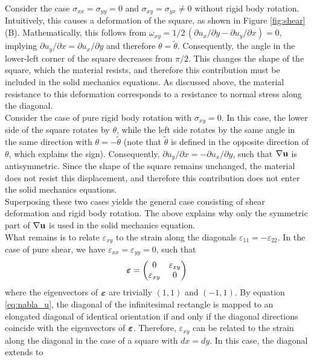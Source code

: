 Consider the case $\sigma_{xx}=\sigma_{yy}= 0$ and $\sigma_{xy}=\sigma_{yx}\neq 0$ without rigid body rotation. Intuitively, this causes a deformation of the square, as shown in Figure \ref{fig:shear} (B). Mathematically, this follows from $\omega_{xy}=1/2\, (\partial u_x/\partial y - \partial u_y / \partial x)=0$, implying $\partial u_y / \partial x=\partial u_x / \partial y$ and therefore $\theta=\tilde\theta$. Consequently, the angle in the lower-left corner of the square decreases from $\pi/2$. This changes the shape of the square, which the material resists, and therefore this contribution must be included in the solid mechanics equations. As discussed above, the material resistance to this deformation corresponds to a resistance to normal stress along the diagonal.\\
Consider the case of pure rigid body rotation with $\sigma_{xy}=0$. In this case, the lower side of the square rotates by $\theta$, while the left side rotates by the same angle in the same direction with $\theta=-\tilde{\theta}$ (note that $\tilde{\theta}$ is defined in the opposite direction of $\theta$, which explains the sign). Consequently, $\partial u_y / \partial x=-\partial u_x / \partial y$, such that $\nabla\mathbf{u}$ is antisymmetric. Since the shape of the square remains unchanged, the material does not resist this displacement, and therefore this contribution does not enter the solid mechanics equations.\\
Superposing these two cases yields the general case consisting of shear deformation and rigid body rotation. The above explains why only the symmetric part of $\nabla\mathbf{u}$ is used in the solid mechanics equation.\\

What remains is to relate $\varepsilon_{xy}$ to the strain along the diagonals $\varepsilon_{11}=-\varepsilon_{22}$. In the case of pure shear, we have $\varepsilon_{xx}=\varepsilon_{yy}=0$, such that
\begin{equation*}
\boldsymbol{\varepsilon} =
\begin{pmatrix}
0 & \varepsilon_{xy} \\
\varepsilon_{xy} & 0
\end{pmatrix}
\end{equation*}
where the eigenvectors of $\boldsymbol{\varepsilon}$ are trivially $(1,1)$ and $(-1,1)$. By equation \eqref{eq:nabla_u}, the diagonal of the infinitesimal rectangle is mapped to an elongated diagonal of identical orientation if and only if the diagonal directions coincide with the eigenvectors of $\boldsymbol{\varepsilon}$. Therefore, $\varepsilon_{xy}$ can be related to the strain along the diagonal in the case of a square with $dx=dy$. In this case, the diagonal extends to

